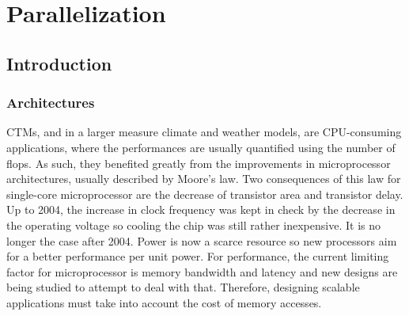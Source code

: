\chapter{Parallelization}
\label{chap:parallel}

\section{Introduction}
\subsection{Architectures}
\label{subsec:architectures}
\glspl{CTM}, and in a larger measure climate and weather models, are
CPU-consuming applications, where the performances are usually quantified using
the number of \gls{flops}. As such, they benefited greatly from the improvements
in microprocessor architectures, usually described by Moore's law. Two
consequences of this law for single-core microprocessor are the decrease of
transistor area and transistor delay. Up to 2004, the increase in clock
frequency was kept in check by the decrease in the operating voltage so cooling
the chip was still rather inexpensive. It is no longer the case after 2004. 
Power is now a scarce resource so new processors aim for a better performance
per unit power. For performance, the current limiting factor for microprocessor
is memory bandwidth and latency and new designs are being studied to attempt to
deal with that.  Therefore, designing scalable applications must take into
account the cost of memory accesses.

